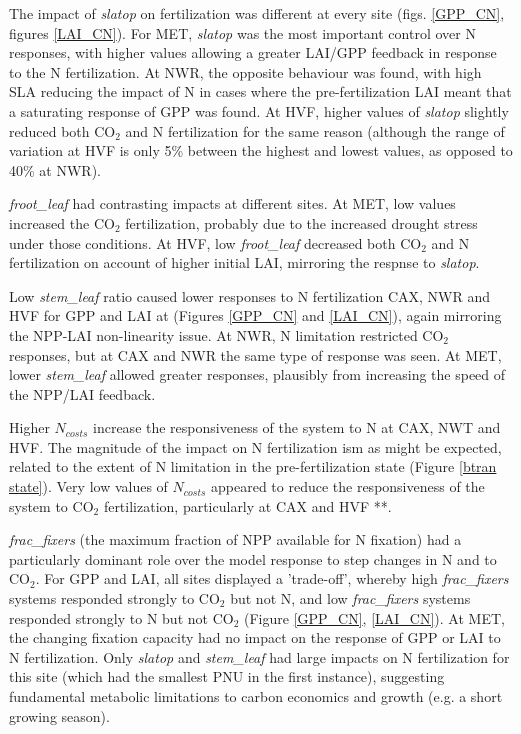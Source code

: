 \documentclass[draft,linenumbers]{agujournal}
\begin{document}
The impact of \emph{slatop} on fertilization was different at every site (figs. \ref{GPP_CN}, figures \ref{LAI_CN}). For MET, \emph{slatop} was the most important control over N responses, with higher values allowing a greater LAI/GPP feedback in response to the N fertilization. At NWR, the opposite behaviour was found, with high SLA reducing the impact of N in cases where the pre-fertilization LAI meant that a saturating response of GPP was found. At HVF, higher values of \emph{slatop} slightly reduced both CO$_{2}$ and N fertilization for the same reason (although the range of variation at HVF is only 5\% between the highest and lowest values, as opposed to 40\% at NWR).

\emph{froot\_leaf} had contrasting impacts at different sites.  At MET,  low values increased the CO$_{2}$ fertilization, probably due to the increased drought stress under those conditions. At HVF, low \emph{froot\_leaf} decreased both CO$_{2}$ and N fertilization on account of higher initial LAI, mirroring the respnse to \emph{slatop}. 

Low \emph{stem\_leaf} ratio caused lower responses to N fertilization CAX, NWR and HVF for GPP and LAI at  (Figures \ref{GPP_CN} and \ref{LAI_CN}), again mirroring the NPP-LAI non-linearity issue.  At NWR,  N limitation restricted CO$_{2}$ responses, but at CAX and NWR the same type of response was seen.  At MET, lower \emph{stem\_leaf} allowed greater responses, plausibly from increasing the speed of the NPP/LAI feedback.  

Higher $N_{costs}$ increase the responsiveness of the system to N at CAX, NWT and HVF.  The magnitude of the impact on N fertilization ism as might be expected, related to the extent of N limitation in the pre-fertilization state (Figure \ref{btran state}).   Very low values of $N_{costs}$ appeared to reduce the responsiveness of the system to CO$_{2}$ fertilization, particularly at CAX and HVF **. 

\emph{frac\_fixers} (the maximum fraction of NPP available for N fixation) had a particularly dominant role over the model response to step changes in N and to CO$_{2}$. For GPP and LAI, all sites displayed a 'trade-off', whereby high \emph{frac\_fixers} systems responded strongly to CO$_{2}$ but not N, and low \emph{frac\_fixers} systems responded strongly to N but not CO$_{2}$ (Figure \ref{GPP_CN}, \ref{LAI_CN}).   At MET,  the changing fixation capacity had no impact on the response of GPP or LAI to N fertilization.  Only \emph{slatop} and \emph{stem\_leaf} had large impacts on N fertilization for this site (which had the smallest PNU in the first instance), suggesting fundamental metabolic limitations to carbon economics and growth (e.g. a short growing season). 
\end{document}
